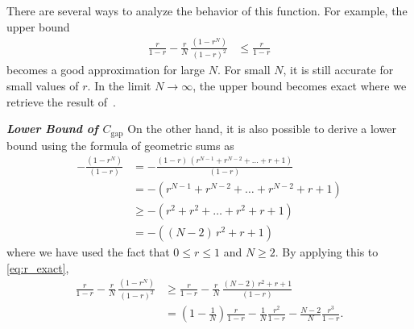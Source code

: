 \begin{proofEnd}
There are several ways to analyze the behavior of this function.
For example, the upper bound 
\begin{align*}
 \frac{r}{1-r} -
 \frac{r}{N}\,\frac{\left(1-r^N\right)}{{\left(1-r\right)}^2}
 &\leq
 \frac{r}{1-r}
\end{align*}
becomes a good approximation for large \(N\).
For small \(N\), it is still accurate for small values of \(r\).
In the limit \(N \rightarrow \infty\), the upper bound becomes exact where we retrieve the result of~\citet[Theorem 3]{tan_monte_2006}.

\textit{\textbf{Lower Bound of \(C_{\text{gap}}\)}}\quad
On the other hand, it is also possible to derive a lower bound using the formula of geometric sums as
\begin{align*}
  -\frac{\left(1-r^N\right)}{{\left(1-r\right)}}
  &=
  -\frac{\left(1-r\right)\,\left(r^{N-1} + r^{N-2} + \ldots + r + 1\right)}{{\left(1-r\right)}}
  \\
  &=
  -\left(r^{N-1} + r^{N-2} + \ldots + r^{N-2} + r + 1\right)
  \\
  &\geq
  -\left(r^2 + r^2 + \ldots + r^2 +  r + 1\right)
  \\
  &=
  -\left((N-2)\,r^2 + r + 1\right)
\end{align*}
where we have used the fact that \(0 \leq r \leq 1\) and \(N \geq 2\).
By applying this to \cref{eq:r_exact},
\begin{align}
 \frac{r}{1-r} -
 \frac{r}{N}\,\frac{\left(1-r^N\right)}{{\left(1-r\right)}^2}
 &\geq 
 \frac{r}{1-r} -
 \frac{r}{N}\,\frac{(N-2)\,r^2 + r + 1}{\left(1-r\right)}
 \nonumber
 \\
 &=
 \left(1 - \frac{1}{N}\right) \frac{r}{1-r}
 -
 \frac{1}{N} \frac{r^2}{1-r}
 -
 \frac{N-2}{N} \frac{r^3}{1-r}.\label{eq:r_lowerbound}
\end{align}

\begin{figure}[H]
  \centering
\end{figure}
\end{proofEnd}
